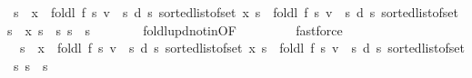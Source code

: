 \begin{isabellebody}
\ {\isachardoublequoteopen}s\ {\isacharless}{\kern0pt}\ x\ {\isasymLongrightarrow}\ foldl\ {\isacharquery}{\kern0pt}f\ {\isacharparenleft}{\kern0pt}{\isasymlambda}s{\isachardot}{\kern0pt}\ {\isacharparenleft}{\kern0pt}v\ {\isachardollar}{\kern0pt}\ s{\isacharcomma}{\kern0pt}\ d\ s{\isacharparenright}{\kern0pt}{\isacharparenright}{\kern0pt}\ {\isacharparenleft}{\kern0pt}sorted{\isacharunderscore}{\kern0pt}list{\isacharunderscore}{\kern0pt}of{\isacharunderscore}{\kern0pt}set\ {\isacharbraceleft}{\kern0pt}{\isachardot}{\kern0pt}{\isachardot}{\kern0pt}x{\isacharprime}{\kern0pt}{\isacharbraceright}{\kern0pt}{\isacharparenright}{\kern0pt}\ s\ {\isacharequal}{\kern0pt}\ foldl\ {\isacharquery}{\kern0pt}f\ {\isacharparenleft}{\kern0pt}{\isasymlambda}s{\isachardot}{\kern0pt}\ {\isacharparenleft}{\kern0pt}v\ {\isachardollar}{\kern0pt}\ s{\isacharcomma}{\kern0pt}\ d\ s{\isacharparenright}{\kern0pt}{\isacharparenright}{\kern0pt}\ {\isacharparenleft}{\kern0pt}sorted{\isacharunderscore}{\kern0pt}list{\isacharunderscore}{\kern0pt}of{\isacharunderscore}{\kern0pt}set\ {\isacharbraceleft}{\kern0pt}s{\isacharprime}{\kern0pt}\ {\isasymin}\ {\isacharbraceleft}{\kern0pt}{\isachardot}{\kern0pt}{\isachardot}{\kern0pt}x{\isacharprime}{\kern0pt}{\isacharbraceright}{\kern0pt}{\isachardot}{\kern0pt}\ s{\isacharprime}{\kern0pt}\ {\isasymle}\ s{\isacharbraceright}{\kern0pt}{\isacharparenright}{\kern0pt}\ s{\isachardoublequoteclose}\ \ s\isanewline
\ \ \ \ \ \ \isamarkupfalse%
\ foldl{\isacharunderscore}{\kern0pt}upd{\isacharunderscore}{\kern0pt}notin{\isacharprime}{\kern0pt}{\isacharbrackleft}{\kern0pt}OF\ {}{\isacharbrackright}{\kern0pt}\isanewline
\ \ \ \ \ \ \isamarkupfalse%
\ fastforce\isanewline
\ \ \ \ \isamarkupfalse%
\ {}{\isacharcolon}{\kern0pt}\ {\isachardoublequoteopen}s\ {\isacharless}{\kern0pt}\ x\ {\isasymLongrightarrow}\ foldl\ {\isacharquery}{\kern0pt}f\ {\isacharparenleft}{\kern0pt}{\isasymlambda}s{\isachardot}{\kern0pt}\ {\isacharparenleft}{\kern0pt}v\ {\isachardollar}{\kern0pt}\ s{\isacharcomma}{\kern0pt}\ d\ s{\isacharparenright}{\kern0pt}{\isacharparenright}{\kern0pt}\ {\isacharparenleft}{\kern0pt}sorted{\isacharunderscore}{\kern0pt}list{\isacharunderscore}{\kern0pt}of{\isacharunderscore}{\kern0pt}set\ {\isacharbraceleft}{\kern0pt}{\isachardot}{\kern0pt}{\isachardot}{\kern0pt}x{\isacharprime}{\kern0pt}{\isacharbraceright}{\kern0pt}{\isacharparenright}{\kern0pt}\ s\ {\isacharequal}{\kern0pt}\ foldl\ {\isacharquery}{\kern0pt}f\ {\isacharparenleft}{\kern0pt}{\isasymlambda}s{\isachardot}{\kern0pt}\ {\isacharparenleft}{\kern0pt}v\ {\isachardollar}{\kern0pt}\ s{\isacharcomma}{\kern0pt}\ d\ s{\isacharparenright}{\kern0pt}{\isacharparenright}{\kern0pt}\ {\isacharparenleft}{\kern0pt}sorted{\isacharunderscore}{\kern0pt}list{\isacharunderscore}{\kern0pt}of{\isacharunderscore}{\kern0pt}set\ {\isacharbraceleft}{\kern0pt}{\isachardot}{\kern0pt}{\isachardot}{\kern0pt}s{\isacharbraceright}{\kern0pt}{\isacharparenright}{\kern0pt}\ s{\isachardoublequoteclose}\ \ s\isanewline

\end{isabellebody}
